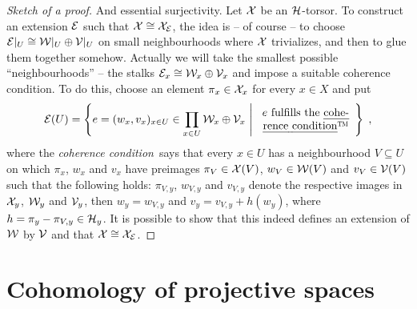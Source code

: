 \documentclass[a4paper,parskip=half,numbers=enddot, DIV=12]{scrreprt}
\begin{document}
\begin{proof}[Sketch of a proof]
	And essential surjectivity. Let $\mathcal{X}$ be an $\mathcal{H}$-torsor. To construct an extension $\mathcal{E}$ such that $\mathcal{X}\cong \mathcal{X}_{\mathcal{E}}$, the idea is -- of course -- to choose $\mathcal{E}|_U\cong \mathcal{W}|_U\oplus\mathcal{V}|_U$ on small neighbourhoods where $\mathcal{X}$ trivializes, and then to glue them together somehow. Actually we will take the smallest possible ``neighbourhoods'' -- the stalks $\mathcal{E}_x\cong\mathcal{W}_x\oplus\mathcal{V}_x$ and impose a suitable coherence condition. To do this, choose an element $\pi_x\in\mathcal{X}_x$ for every $x\in X$ and put
	\begin{align*}
	\Ee(U)=\left\{e=(w_x,v_x)_{x\in U}\in \prod_{x\in U}\Ww_x\oplus\Vv_x\st\begin{array}{c}
	e\text{ fulfills the \emph{cohe-}}\\
	\text{\emph{rence condition}\texttrademark}
	\end{array}\right\}\;,
	\end{align*}
	where the \emph{coherence condition}\texttrademark\ says that every $x\in U$ has a neighbourhood $V\subseteq U$ on which $\pi_x$, $w_x$ and $v_x$ have preimages $\pi_V\in \mathcal{X}(V)$, $w_V\in\mathcal{W}(V)$ and $v_V\in\mathcal{V}(V)$ such that the following holds: $\pi_{V,y}$, $w_{V,y}$ and $v_{V,y}$ denote the respective images in $\mathcal{X}_y$, $\mathcal{W}_y$ and $\mathcal{V}_y$, then $w_y=w_{V,y}$ and $v_y=v_{V,y}+h(w_y)$, where $h=\pi_y-\pi_{V,y}\in\mathcal{H}_y$. It is possible to show that this indeed defines an extension of $\mathcal{W}$ by $\mathcal{V}$ and that $\mathcal{X}\cong\mathcal{X}_{\mathcal{E}}$.
\end{proof}

\chapter{Cohomology of projective spaces}
\end{document}
